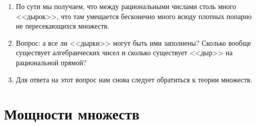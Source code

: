 \begin{enumerate}
\item По сути мы получаем, что между рациональными числами столь много <<дырок>>, что там умещается бесконечно много всюду плотных попарно не пересекающихся множеств.
\item Вопрос: а все ли <<дырки>> могут быть ими заполнены? Сколько вообще существует алгебраических чисел и сколько существует <<дыр>> на рациональной прямой?
\item Для ответа на этот вопрос нам снова следует обратиться к теории множеств.
\end{enumerate}

\section{Мощности множеств}\label{powers}



